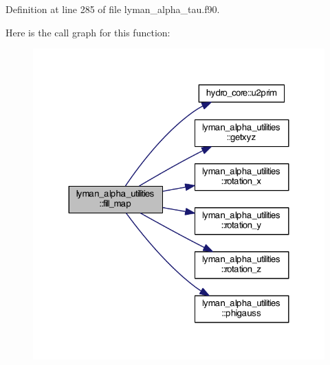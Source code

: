 Definition at line 285 of file lyman\+\_\+alpha\+\_\+tau.\+f90.



Here is the call graph for this function\+:\nopagebreak
\begin{figure}[H]
\begin{center}
\leavevmode
\includegraphics[width=324pt]{namespacelyman__alpha__utilities_a7ca5810d29123f1c5c6fd3170f5f5bf3_cgraph}
\end{center}
\end{figure}


\hypertarget{namespacelyman__alpha__utilities_abdefc59ee98b1526aa3116c0e8f21d98}{}
